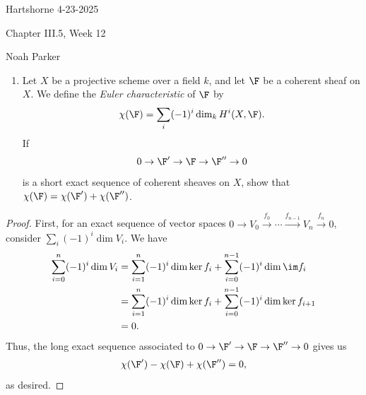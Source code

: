 \documentclass[12pt]{amsart}
\begin{document}
{Hartshorne} \hfill {4-23-2025}

\bigskip\bigskip

\begin{center}

{\sc Chapter III.5, Week 12}

\end{center}

\begin{center}

  {Noah Parker} %
    
\end{center}

\bigskip\bigskip

\begin{enumerate}
  \item[5.1.] {
      Let $X$ be a projective scheme over a field $k$, and let $\F$ be a coherent sheaf on $X$.
      We define the \emph{Euler characteristic} of $\F$ by
      \[
        \chi(\F)=\sum_i(-1)^i\dim_kH^i(X,\F).
      \] 
      If
      \[
        0\to \F'\to \F\to \F''\to 0
      \] 
      is a short exact sequence of coherent sheaves on $X$, show that $\chi(\F)=\chi(\F')+\chi(\F'')$.
    }
\end{enumerate}

\begin{proof}
  First, for an exact sequence of vector spaces $0\to V_0\xrightarrow{f_0}\cdots\xrightarrow{f_{n-1}} V_n\xrightarrow{f_n}0$, consider $\sum_i(-1)^i\dim V_i$.
  We have 
  \begin{align*}
    \sum_{i=0}^n(-1)^i\dim V_i 
    &= \sum_{i=1}^n(-1)^i\dim \ker f_i +\sum_{i=0}^{n-1}(-1)^i\dim \im f_i \\
    &= \sum_{i=1}^n(-1)^i \dim \ker f_i +\sum_{i=0}^{n-1} (-1)^i\dim\ker f_{i+1} \\
    &=0.
  \end{align*}
  Thus, the long exact sequence associated to $0\to \F'\to \F\to \F''\to 0$ gives us
  \begin{align*}
    \chi(\F')-\chi(\F)+\chi(\F'')= 0,
  \end{align*}
  as desired.
\end{proof}
\end{document}
